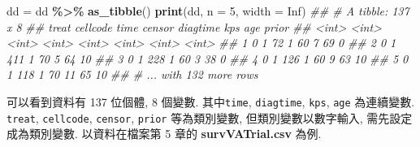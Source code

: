 \documentclass[
]{book}
\newenvironment{Shaded}{\begin{snugshade}}{\end{snugshade}}
\newcommand{\CommentTok}[1]{\textcolor[rgb]{0.56,0.35,0.01}{\textit{#1}}}
\newcommand{\DataTypeTok}[1]{\textcolor[rgb]{0.13,0.29,0.53}{#1}}
\newcommand{\DecValTok}[1]{\textcolor[rgb]{0.00,0.00,0.81}{#1}}
\newcommand{\KeywordTok}[1]{\textcolor[rgb]{0.13,0.29,0.53}{\textbf{#1}}}
\newcommand{\NormalTok}[1]{#1}
\newcommand{\OperatorTok}[1]{\textcolor[rgb]{0.81,0.36,0.00}{\textbf{#1}}}
\newcommand{\OtherTok}[1]{\textcolor[rgb]{0.56,0.35,0.01}{#1}}
\newcommand{\StringTok}[1]{\textcolor[rgb]{0.31,0.60,0.02}{#1}}
\begin{document}
\begin{Shaded}
\begin{Highlighting}[]
\NormalTok{dd =}\StringTok{ }\NormalTok{dd }\OperatorTok{\%\textgreater{}\%}\StringTok{ }\KeywordTok{as\_tibble}\NormalTok{()}
\KeywordTok{print}\NormalTok{(dd, }\DataTypeTok{n =} \DecValTok{5}\NormalTok{, }\DataTypeTok{width =} \OtherTok{Inf}\NormalTok{)}
\CommentTok{\#\# \# A tibble: 137 x 8}
\CommentTok{\#\#   treat cellcode  time censor diagtime   kps   age prior}
\CommentTok{\#\#   \textless{}int\textgreater{}    \textless{}int\textgreater{} \textless{}int\textgreater{}  \textless{}int\textgreater{}    \textless{}int\textgreater{} \textless{}int\textgreater{} \textless{}int\textgreater{} \textless{}int\textgreater{}}
\CommentTok{\#\# 1     0        1    72      1       60     7    69     0}
\CommentTok{\#\# 2     0        1   411      1       70     5    64    10}
\CommentTok{\#\# 3     0        1   228      1       60     3    38     0}
\CommentTok{\#\# 4     0        1   126      1       60     9    63    10}
\CommentTok{\#\# 5     0        1   118      1       70    11    65    10}
\CommentTok{\#\# \# ... with 132 more rows}
\end{Highlighting}
\end{Shaded}

可以看到資料有 137 位個體, 8 個變數.
其中\texttt{time}, \texttt{diagtime}, \texttt{kps}, \texttt{age} 為連續變數.
\texttt{treat}, \texttt{cellcode}, \texttt{censor}, \texttt{prior} 等為類別變數,
但類別變數以數字輸入, 需先設定成為類別變數.
以資料在檔案第 5 章的 \textbf{survVATrial.csv} 為例.
\end{document}
